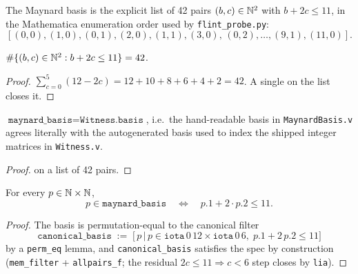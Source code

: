 \begin{definition}[Basis]\label{def:maynard_basis}
\rocqok
The Maynard basis is the explicit list of 42 pairs $(b, c) \in \mathbb{N}^2$
with $b + 2c \le 11$, in the Mathematica enumeration order used by
\texttt{flint\_probe.py}:
\[
[(0,0), (1,0), (0,1), (2,0), (1,1), (3,0),\, (0,2), \ldots, (9,1), (11,0)].
\]
\end{definition}

\begin{lemma}\label{lem:basis_size}
\rocqok
{}
$\#\{(b, c) \in \mathbb{N}^2 : b + 2c \le 11\} = 42$.
\end{lemma}
\begin{proof}\rocqok
$\sum_{c=0}^{5}(12 - 2c) = 12 + 10 + 8 + 6 + 4 + 2 = 42$.
A single \vmcompute{} on the list closes it.
\end{proof}

\begin{lemma}\label{lem:basis_matches}
\rocqok
{}
$\texttt{maynard\_basis} = \texttt{Witness.basis}$,
i.e.\ the hand-readable basis in \texttt{MaynardBasis.v} agrees
literally with the autogenerated basis used to index the shipped
integer matrices in \texttt{Witness.v}.
\end{lemma}
\begin{proof}\rocqok
\vmcompute{} on a list of 42 pairs.
\end{proof}

\begin{lemma}\label{lem:basis_spec}
\rocqok
{}
For every $p \in \mathbb{N} \times \mathbb{N}$,
\[
  p \in \texttt{maynard\_basis} \quad\iff\quad p.1 + 2 \cdot p.2 \le 11.
\]
\end{lemma}
\begin{proof}\rocqok
The basis is permutation-equal to the canonical filter
\[
  \texttt{canonical\_basis} \;:=\; \bigl[\, p \,\big|\, p \in
    \texttt{iota}\,0\,12 \times \texttt{iota}\,0\,6,\; p.1 + 2\,p.2 \le 11
  \bigr]
\]
by a \vmcompute{} \texttt{perm\_eq} lemma, and \texttt{canonical\_basis}
satisfies the spec by construction (\texttt{mem\_filter} +
\texttt{allpairs\_f}; the residual $2c \le 11 \Rightarrow c < 6$ step
closes by \texttt{lia}).
\end{proof}

